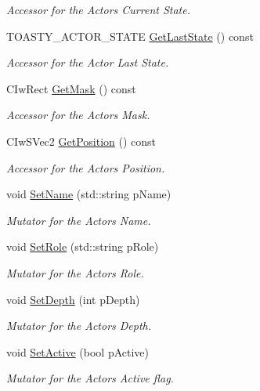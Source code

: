 \begin{DoxyCompactItemize}
\begin{DoxyCompactList}\small\item\em Accessor for the Actors Current State. \end{DoxyCompactList}\item 
TOASTY\_\-ACTOR\_\-STATE \hyperlink{class_i_ty_actor_ab1c7d4089d543bf258e02854c00969f0}{GetLastState} () const 
\begin{DoxyCompactList}\small\item\em Accessor for the Actor Last State. \end{DoxyCompactList}\item 
CIwRect \hyperlink{class_i_ty_actor_a029053700af64bae8290b5dcfa04ceec}{GetMask} () const 
\begin{DoxyCompactList}\small\item\em Accessor for the Actors Mask. \end{DoxyCompactList}\item 
CIwSVec2 \hyperlink{class_i_ty_actor_a545fb58ad751ccbc8a33729ede2b7415}{GetPosition} () const 
\begin{DoxyCompactList}\small\item\em Accessor for the Actors Position. \end{DoxyCompactList}\item 
void \hyperlink{class_i_ty_actor_a3ecdf0c6c1502c4b5a4a7227811ad0e3}{SetName} (std::string pName)
\begin{DoxyCompactList}\small\item\em Mutator for the Actors Name. \end{DoxyCompactList}\item 
void \hyperlink{class_i_ty_actor_abbf80ab3261ea1ffa4a83e8958f486bd}{SetRole} (std::string pRole)
\begin{DoxyCompactList}\small\item\em Mutator for the Actors Role. \end{DoxyCompactList}\item 
void \hyperlink{class_i_ty_actor_a23072345bc259b4a18c702238e3f9249}{SetDepth} (int pDepth)
\begin{DoxyCompactList}\small\item\em Mutator for the Actors Depth. \end{DoxyCompactList}\item 
void \hyperlink{class_i_ty_actor_ad2a1db314df31d4c1114132154644e2d}{SetActive} (bool pActive)
\begin{DoxyCompactList}\small\item\em Mutator for the Actors Active flag. \end{DoxyCompactList}\item 

\end{DoxyCompactItemize}
